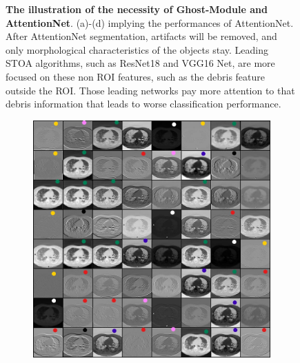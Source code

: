 \begin{figure}[t]
\begin{center}
\begin{subfigure}[b]{0.33\textwidth}
			\caption{}
			\label{fig:cellnet}
		\end{subfigure}
	\end{center}
	\caption{\textbf{The illustration of the necessity of Ghost-Module and AttentionNet}. (a)-(d) implying the performances of AttentionNet. After AttentionNet segmentation, artifacts will be removed, and only morphological characteristics of the objects stay. Leading  STOA  algorithms, such as ResNet18 and VGG16 Net, are more focused on these non  ROI  features,  such as the debris feature outside the ROI. Those leading networks pay more attention to that debris information that leads to worse classification performance.}
\end{figure}

\begin{figure}[t]
	\begin{center}
		\begin{subfigure}[b]{0.33\textwidth}
			\includegraphics[height= 0.20\textheight]{thesis-template-master/images/Inkedfirst Conv1 of resnet18 with pretrain weights on coviddataset_LI.jpg}
			\caption{}
			\label{fig:res18}
		\end{subfigure}
		\begin{subfigure}[b]{0.33\textwidth}

\end{subfigure}
\end{center}
\end{figure}
